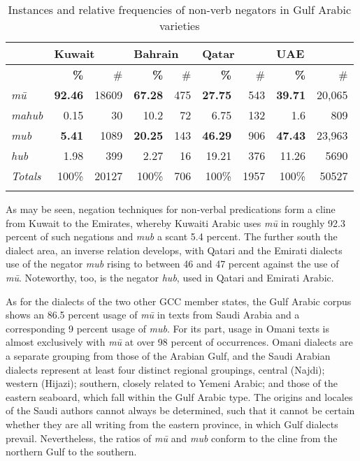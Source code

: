 \documentclass[output=paper]{langsci/langscibook}
\begin{document}
\begin{table}[!h]
	\centering
	\caption{Instances and relative frequencies of non-verb negators in Gulf Arabic varieties}
	\label{tab:WiAR-3}
\begin{tabular}{lrrrrrrrr}
\lsptoprule
\textit{} & \multicolumn{2}{l}{Kuwait} & \multicolumn{2}{l}{Bahrain} & \multicolumn{2}{l}{Qatar} & \multicolumn{2}{l}{UAE} \\ \midrule
\textit{} & \textbf{\%} & \# & \textbf{\%} & \# & \textbf{\%} & \# & \textbf{\%} & \# \\ \midrule
\textit{mū} & \textbf{92.46} & 18609 & \textbf{67.28} & 475 & \textbf{27.75} & 543 & \textbf{39.71} & 20,065 \\
\textit{mahub} & 0.15 & 30 & 10.2 & 72 & 6.75 & 132 & 1.6 & 809 \\
\textit{mub} & \textbf{5.41} & 1089 & \textbf{20.25} & 143 & \textbf{46.29} & 906 & \textbf{47.43} & 23,963 \\
\textit{hub} & 1.98 & 399 & 2.27 & 16 & 19.21 & 376 & 11.26 & 5690 \\ \midrule
\textit{Totals} & 100\% & 20127 & 100\% & 706 & 100\% & 1957 & 100\% & 50527 \\ \lspbottomrule   
\end{tabular}
\end{table}

As may be seen, negation techniques for non-verbal predications form a cline from Kuwait to the Emirates, whereby Kuwaiti Arabic uses \textit{mū} in roughly 92.3 percent of such negations and \textit{mub} a scant 5.4 percent. The further south the dialect area, an inverse relation develops, with Qatari and the Emirati dialects use of the negator \textit{mub} rising to between 46 and 47 percent against the use of \textit{mū}. Noteworthy, too, is the negator \textit{hub}, used in Qatari and Emirati Arabic.

As for the dialects of the two other GCC member states, the Gulf Arabic corpus shows an 86.5 percent usage of \textit{mū} in texts from Saudi Arabia and a corresponding 9 percent usage of \textit{mub}. For its part, usage in Omani texts is almost exclusively with \textit{mū} at over 98 percent of occurrences. Omani dialects are a separate grouping from those of the Arabian Gulf, and the Saudi Arabian dialects represent at least four distinct regional groupings, central (Najdi); western (Hijazi); southern, closely related to Yemeni Arabic; and those of the eastern seaboard, which fall within the Gulf Arabic type. The origins and locales of the Saudi authors cannot always be determined, such that it cannot be certain whether they are all writing from the eastern province, in which Gulf dialects prevail. Nevertheless, the ratios of \textit{mū} and \textit{mub} conform to the cline from the northern Gulf to the southern.
\end{document}
